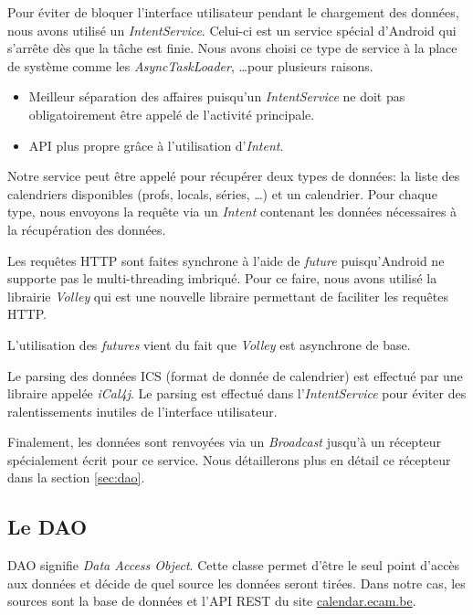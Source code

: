 \documentclass{article}
\begin{document}
            Pour éviter de bloquer l'interface utilisateur pendant le chargement des données, nous
            avons utilisé un \textit{IntentService}. Celui-ci est un service spécial d'Android qui
            s'arrête dès que la tâche est finie. Nous avons choisi ce type de service à la place de
            système comme les \textit{AsyncTaskLoader}, \ldots pour plusieurs raisons.
            \begin{itemize}
                \item Meilleur séparation des affaires puisqu'un \textit{IntentService} ne doit pas
                    obligatoirement être appelé de l'activité principale.
                \item API plus propre grâce à l'utilisation d'\textit{Intent}.
            \end{itemize}

            Notre service peut être appelé pour récupérer deux types de données: la liste des
            calendriers disponibles (profs, locals, séries, \ldots) et un calendrier. Pour chaque
            type, nous envoyons la requête via un \textit{Intent} contenant les données nécessaires
            à la récupération des données.

            Les requêtes HTTP sont faites synchrone à l'aide de \textit{future} puisqu'Android ne
            supporte pas le multi-threading imbriqué. Pour ce faire, nous avons utilisé la librairie
            \textit{Volley} qui est une nouvelle libraire permettant de faciliter les requêtes HTTP.

            L'utilisation des \textit{futures} vient du fait que \textit{Volley} est asynchrone de
            base.

            Le parsing des données ICS (format de donnée de calendrier) est effectué par une
            libraire appelée \textit{iCal4j}. Le parsing est effectué dans l'\textit{IntentService}
            pour éviter des ralentissements inutiles de l'interface utilisateur.

            Finalement, les données sont renvoyées via un \textit{Broadcast} jusqu'à un récepteur
            spécialement écrit pour ce service. Nous détaillerons plus en détail ce récepteur dans
            la section \ref{sec:dao}.

        \label{sec:dao}
        \subsection{Le DAO}
            DAO signifie \textit{Data Access Object}. Cette classe permet d'être le seul point
            d'accès aux données et décide de quel source les données seront tirées. Dans notre cas,
            les sources sont la base de données et l'API REST du site \url{calendar.ecam.be}.
\end{document}
